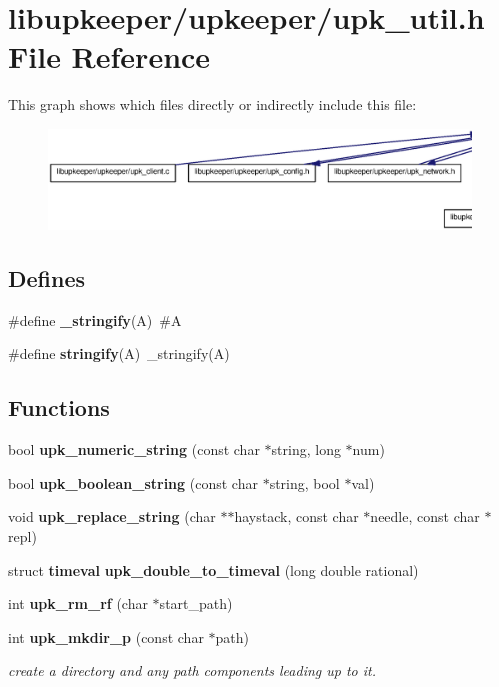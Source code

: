 \section{libupkeeper/upkeeper/upk\_\-util.h File Reference}
\label{upk__util_8h}
This graph shows which files directly or indirectly include this file:
\nopagebreak
\begin{figure}[H]
\begin{center}
\leavevmode
\includegraphics[width=400pt]{upk__util_8h__dep__incl}
\end{center}
\end{figure}
\subsection*{Defines}
\begin{DoxyCompactItemize}
\item 
\#define {\bf \_\-stringify}(A)~\#A
\item 
\#define {\bf stringify}(A)~\_\-stringify(A)
\end{DoxyCompactItemize}
\subsection*{Functions}
\begin{DoxyCompactItemize}
\item 
bool {\bf upk\_\-numeric\_\-string} (const char $\ast$string, long $\ast$num)
\item 
bool {\bf upk\_\-boolean\_\-string} (const char $\ast$string, bool $\ast$val)
\item 
void {\bf upk\_\-replace\_\-string} (char $\ast$$\ast$haystack, const char $\ast$needle, const char $\ast$repl)
\item 
struct {\bf timeval} {\bf upk\_\-double\_\-to\_\-timeval} (long double rational)
\item 
int {\bf upk\_\-rm\_\-rf} (char $\ast$start\_\-path)
\item 
int {\bf upk\_\-mkdir\_\-p} (const char $\ast$path)
\begin{DoxyCompactList}\small\item\em create a directory and any path components leading up to it. \end{DoxyCompactList}\end{DoxyCompactItemize}


